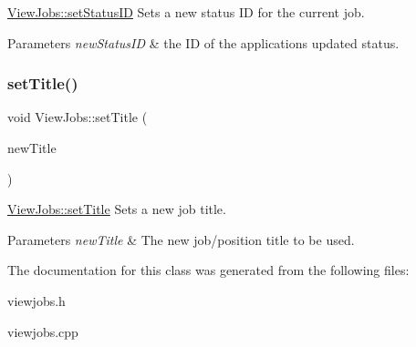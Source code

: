 \mbox{\hyperlink{class_view_jobs_a55943415fd91377d5f701f7074ba58d6}{View\+Jobs\+::set\+Status\+ID}} Sets a new status ID for the current job. 


\begin{DoxyParams}{Parameters}
{\em new\+Status\+ID} & the ID of the application\textquotesingle{}s updated status. \\
\hline
\end{DoxyParams}
\mbox{\label{class_view_jobs_abfe1969197cde57ea049c1b7d91cd4f5}} 
\subsubsection{\texorpdfstring{set\+Title()}{setTitle()}}
{\footnotesize\ttfamily void View\+Jobs\+::set\+Title (\begin{DoxyParamCaption}\item[{Q\+String}]{new\+Title }\end{DoxyParamCaption})}



\mbox{\hyperlink{class_view_jobs_abfe1969197cde57ea049c1b7d91cd4f5}{View\+Jobs\+::set\+Title}} Sets a new job title. 


\begin{DoxyParams}{Parameters}
{\em new\+Title} & The new job/position title to be used. \\
\hline
\end{DoxyParams}


The documentation for this class was generated from the following files\+:\begin{DoxyCompactItemize}
\item 
viewjobs.\+h\item 
viewjobs.\+cpp\end{DoxyCompactItemize}
